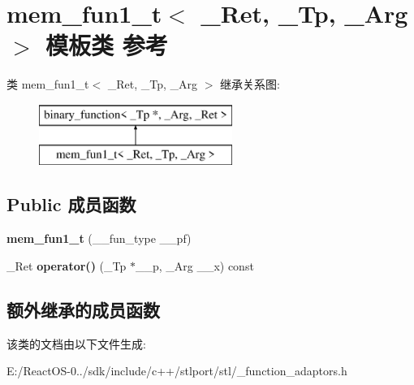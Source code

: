 \hypertarget{classmem__fun1__t}{}\section{mem\+\_\+fun1\+\_\+t$<$ \+\_\+\+Ret, \+\_\+\+Tp, \+\_\+\+Arg $>$ 模板类 参考}
\label{classmem__fun1__t}
类 mem\+\_\+fun1\+\_\+t$<$ \+\_\+\+Ret, \+\_\+\+Tp, \+\_\+\+Arg $>$ 继承关系图\+:\begin{figure}[H]
\begin{center}
\leavevmode
\includegraphics[height=2.000000cm]{classmem__fun1__t}
\end{center}
\end{figure}
\subsection*{Public 成员函数}
\begin{DoxyCompactItemize}
\item 
\mbox{\label{classmem__fun1__t_aa06633b5df4b851aab98f308421ca4da}} 
{\bfseries mem\+\_\+fun1\+\_\+t} (\+\_\+\+\_\+fun\+\_\+type \+\_\+\+\_\+pf)
\item 
\mbox{\label{classmem__fun1__t_a508b7563166995d6aec017f98779cf01}} 
\+\_\+\+Ret {\bfseries operator()} (\+\_\+\+Tp $\ast$\+\_\+\+\_\+p, \+\_\+\+Arg \+\_\+\+\_\+x) const
\end{DoxyCompactItemize}
\subsection*{额外继承的成员函数}


该类的文档由以下文件生成\+:\begin{DoxyCompactItemize}
\item 
E\+:/\+React\+O\+S-\/0../sdk/include/c++/stlport/stl/\+\_\+function\+\_\+adaptors.\+h\end{DoxyCompactItemize}
